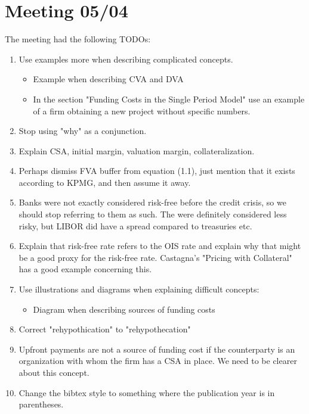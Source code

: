 \documentclass[10pt,a4paper]{article}
\begin{document}
    \section{Meeting 05/04}
        The meeting had the following TODOs:
        \begin{enumerate}
            \item Use examples more when describing complicated concepts.
            \begin{itemize}
                \item Example when describing CVA and DVA
                \item In the section "Funding Costs in the Single Period Model" 
                    use an example of a firm obtaining a new project without specific numbers.  
            \end{itemize}  
            \item Stop using "why" as a conjunction.
            \item Explain CSA, initial margin, valuation margin, collateralization.
            \item Perhaps dismiss FVA buffer from equation (1.1), just mention that it exists according to KPMG, and then assume it away.
            \item Banks were not exactly considered risk-free before the credit crisis, so we should stop referring to them as such.
                The were definitely considered less risky, but LIBOR did have a spread compared to treasuries etc.
            \item Explain that risk-free rate refers to the OIS rate and explain why that might be a good proxy for the risk-free rate.
                Castagna's "Pricing with Collateral" has a good example concerning this.
            \item Use illustrations and diagrams when explaining difficult concepts:
            \begin{itemize}
                \item Diagram when describing sources of funding costs
            \end{itemize}
            \item Correct "rehypothication" to "rehypothecation"
            \item Upfront payments are not a source of funding cost 
                if the counterparty is an organization with whom the firm has a CSA in place.
                We need to be clearer about this concept. 
            \item Change the bibtex style to something where the publication year is in parentheses.

\end{enumerate}
\end{document}
